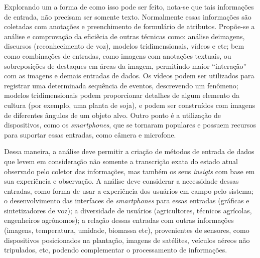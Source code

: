 \documentclass[12pt]{article}
\begin{document}
Explorando um a forma de como isso pode ser feito, nota-se que tais informações de entrada, não precisam ser somente texto. Normalmente essas informações são coletadas com anotações e preenchimento de formulário de atributos. Propõe-se a análise e comprovação da eficiêcia de outras técnicas como: análise deimagens, discursos (reconhecimento de voz), modelos tridimensionais, vídeos e etc; bem como combinações de entradas, como imagens com anotações textuais, ou sobreposições de destaques em áreas da imagem, permitindo maior ``interação'' com as imagens e demais entradas de dados. Os vídeos podem ser utilizados para registrar uma determinada sequência de eventos, descrevendo um fenômeno; modelos tridimensionais podem proporcionar detalhes de algum elemento da cultura (por exemplo, uma planta de soja), e podem ser construídos com imagens de diferentes ângulos de um objeto alvo. Outro ponto é a utilização de dispositivos, como os \textit{smartphones}, que se tornaram populares e possuem recursos para suportar essas entradas, como câmera e microfone.

Dessa maneira, a análise deve permitir a criação de métodos de entrada de dados que levem em consideração não somente a transcrição exata do estado atual observado pelo coletor das informações, mas também os seus \textit{insigts} com base em sua experiência e observação. A análise deve considerar a necessidade dessas entradas, como forma de usar a experiência dos usuários em campo pelo sistema; o desenvolvimento das interfaces de \textit{smartphones} para essas entradas (gráficas e sintetizadores de voz); a diversidade de usuários (agricultores, técnicos agrícolas, engenheiros agrônomos); a relação dessas entradas com outras informações (imagens, temperatura, umidade, biomassa etc), provenientes de sensores, como dispositivos posicionados na plantação, imagens de satélites, veículos aéreos não tripulados, etc, podendo complementar o processamento de informações.
\end{document}
